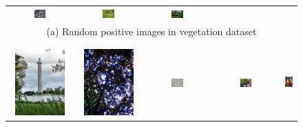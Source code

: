 \begin{figure}[th]
{{\begin{center}
\begin{tabular}{@{}c@{\,\,\,}c@{\,\,\,}c@{\,\,\,}c@{\,\,\,}c@{\,\,\,}}
\includegraphics[width=0.19\textwidth]{imggrid/falseposi/8.jpg} &
\includegraphics[width=0.19\textwidth]{imggrid/falseposi/9.jpg} &
\includegraphics[width=0.19\textwidth]{imggrid/falseposi/10.jpg} \\
\multicolumn{5}{c}{(a) Random positive images in vegetation dataset} \\ 
\\[-6pt]
\hline
\\[-6pt]
\includegraphics[height=1in]{imggrid/falseposi/11.jpg} &
\includegraphics[height=1in]{imggrid/falseposi/12.jpg} &
\includegraphics[width=0.19\textwidth]{imggrid/falseposi/13.jpg} &
\includegraphics[width=0.19\textwidth]{imggrid/falseposi/14.jpg} &
\includegraphics[height=1in]{imggrid/falseposi/15.jpg} \\

\end{tabular}
\end{center}}}
\end{figure}
